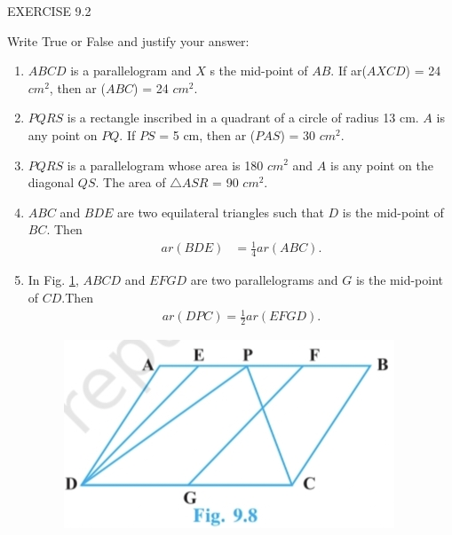 \documentclass{article}
\begin{document}
\begin{center}
\color{cyan} EXERCISE 9.2
\end{center}
\fi
Write True or False and justify your answer:
\begin{enumerate}[label=\thesection.\arabic*,ref=\thesection.\theenumi]
	\item $ABCD$ is a parallelogram and $X$ s the mid-point of $AB$. If ar($AXCD$) = 24 \(cm^2\), then ar ($ABC$) = 24 \(cm^2\).
	\item $PQRS$ is a rectangle inscribed in a quadrant of a circle of radius 13 cm. $A$ is any point on $PQ$. If $PS$ = 5 cm, then ar ($PAS$) = 30 \(cm^2\).
	\item $PQRS$ is a parallelogram whose area is 180 \(cm^2\) and $A$ is any point on the diagonal $QS$. The area of $\triangle{ASR}$ = 90 \(cm^2\).
	\item $ABC$ and $BDE$ are two equilateral triangles such that $D$ is the mid-point of $BC$. Then
	\begin{align}
		{ar (BDE)} &= \frac{1}{4} {ar (ABC)}.
		\label{eq:9.24}
	\end{align}
\item    In Fig. \ref{fig:exemplar/9.9.2/925}, $ABCD$ and $EFGD$ are     two parallelograms and $G$ is the mid-point of $CD$.Then
		\begin{align}
			{ar (DPC)} = \frac{1}{2} {ar (EFGD)}.
			\label{eq:9.25}
		\end{align}
\begin{figure}[h]
	\centering
	\includegraphics[width=\columnwidth]{exemplar/9.9.2/figs/925.jpg}
	\caption{}
	\label{fig:exemplar/9.9.2/925}
\end{figure}
\end{enumerate}
\end{document}
